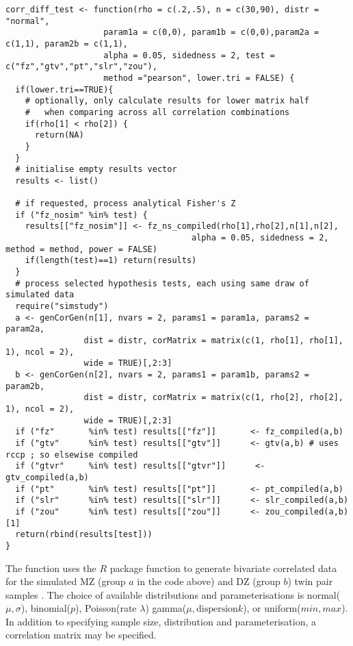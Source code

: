 \begin{lstlisting}[float=h,caption={Single run simulation code},label={lst:corr_diff}]
corr_diff_test <- function(rho = c(.2,.5), n = c(30,90), distr = "normal",
                    param1a = c(0,0), param1b = c(0,0),param2a = c(1,1), param2b = c(1,1),
                    alpha = 0.05, sidedness = 2, test = c("fz","gtv","pt","slr","zou"),
                    method ="pearson", lower.tri = FALSE) {
  if(lower.tri==TRUE){
    # optionally, only calculate results for lower matrix half 
    #   when comparing across all correlation combinations
    if(rho[1] < rho[2]) { 
      return(NA)
    }
  }
  # initialise empty results vector
  results <- list()
  
  # if requested, process analytical Fisher's Z
  if ("fz_nosim" %in% test) {
    results[["fz_nosim"]] <- fz_ns_compiled(rho[1],rho[2],n[1],n[2], 
                                      alpha = 0.05, sidedness = 2, method = method, power = FALSE)
    if(length(test)==1) return(results)
  }
  # process selected hypothesis tests, each using same draw of simulated data
  require("simstudy")
  a <- genCorGen(n[1], nvars = 2, params1 = param1a, params2 = param2a,  
                dist = distr, corMatrix = matrix(c(1, rho[1], rho[1], 1), ncol = 2), 
                wide = TRUE)[,2:3]
  b <- genCorGen(n[2], nvars = 2, params1 = param1b, params2 = param2b,  
                dist = distr, corMatrix = matrix(c(1, rho[2], rho[2], 1), ncol = 2), 
                wide = TRUE)[,2:3]
  if ("fz"       %in% test) results[["fz"]]       <- fz_compiled(a,b)
  if ("gtv"      %in% test) results[["gtv"]]      <- gtv(a,b) # uses rccp ; so elsewise compiled
  if ("gtvr"     %in% test) results[["gtvr"]]      <- gtv_compiled(a,b) 
  if ("pt"       %in% test) results[["pt"]]       <- pt_compiled(a,b)
  if ("slr"      %in% test) results[["slr"]]      <- slr_compiled(a,b)
  if ("zou"      %in% test) results[["zou"]]      <- zou_compiled(a,b)[1]
  return(rbind(results[test]))
}
\end{lstlisting}

The function uses the $R$ package  function  to generate bivariate correlated data for the simulated MZ (group $a$ in the code above) and DZ (group $b$) twin pair samples \cite{simstudy2018}.  The choice of available distributions and parameterisations is normal($\mu,\sigma$), binomial($p$), Poisson(rate $\lambda$) gamma($\mu,\text{dispersion} k$), or uniform($min,max$).  In addition to specifying sample size, distribution and parameterisation, a correlation matrix may be specified.  
\\

